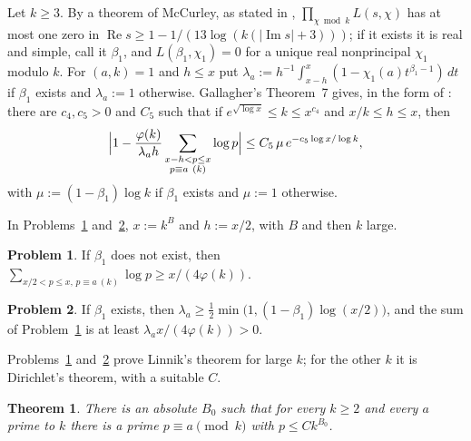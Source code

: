 \documentclass[reqno]{amsart}
\theoremstyle{definition}
\newtheorem{problem}{Problem}[section]
\theoremstyle{plain}
\newtheorem{theorem}{Theorem}[section]
\renewcommand{\Re}{\operatorname{Re}}
\renewcommand{\Im}{\operatorname{Im}}
\begin{document}
Let $k \ge 3$.  By a theorem of McCurley, as stated in \cite[\S1]{TZ1}, $\prod_{\chi \bmod k} L(s, \chi)$ has at most one zero in $\Re s \ge 1 - 1/(13 \log(k(\lvert \Im s \rvert + 3)))$; if it exists it is real and simple, call it $\beta_1$, and $L(\beta_1, \chi_1) = 0$ for a unique real nonprincipal $\chi_1$ modulo $k$.  For $(a, k) = 1$ and $h \le x$ put $\lambda_a := h^{-1} \int_{x-h}^x (1 - \chi_1(a) t^{\beta_1 - 1})\, d t$ if $\beta_1$ exists and $\lambda_a := 1$ otherwise.  Gallagher's Theorem~7 \cite[Thm.~7]{Gal} gives, in the form of \cite[(3.3)--(3.4)]{TZ1}: there are $c_4, c_5 > 0$ and $C_5$ such that if $e^{\sqrt{\log x}} \le k \le x^{c_4}$ and $x/k \le h \le x$, then %
\[
  \Bigl\lvert 1 - \frac{\varphi(k)}{\lambda_a h} \sum_{\substack{x - h < p \le x \\ p \equiv a \ (k)}} \log p \Bigr\rvert
  \le C_5\, \mu\, e^{-c_5 \log x/\log k} ,
\]
with $\mu := (1 - \beta_1)\log k$ if $\beta_1$ exists and $\mu := 1$ otherwise.

In Problems~\ref{pr:linnik-plain} and~\ref{pr:linnik-exc}, $x := k^B$ and $h := x/2$, with $B$ and then $k$ large.

\begin{problem}\label{pr:linnik-plain}
If $\beta_1$ does not exist, then $\sum_{x/2 < p \le x,\, p \equiv a\ (k)} \log p \ge x/(4\varphi(k))$.
\end{problem}

\begin{problem}\label{pr:linnik-exc}
If $\beta_1$ exists, then $\lambda_a \ge \frac12 \min\bigl(1, (1 - \beta_1)\log(x/2)\bigr)$, and the sum of Problem~\ref{pr:linnik-plain} is at least $\lambda_a x/(4\varphi(k)) > 0$.
\end{problem}

Problems~\ref{pr:linnik-plain} and~\ref{pr:linnik-exc} prove Linnik's theorem \cite{Lin} for large $k$; for the other $k$ it is Dirichlet's theorem, with a suitable $C$.

\begin{theorem}\label{thm:linnik}
There is an absolute $B_0$ such that for every $k \ge 2$ and every $a$ prime to $k$ there is a prime $p \equiv a \pmod k$ with $p \le C k^{B_0}$.
\end{theorem}
\end{document}
